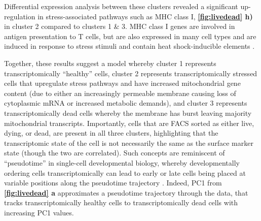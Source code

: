 Differential expression analysis between these clusters revealed a significant up-regulation in stress-associated pathways such as MHC class I,  \textbf{\autoref{fig:livedead} h)} in cluster 2 compared to clusters 1 \& 3. MHC class I genes are involved in antigen presentation to T cells, but are also expressed in many cell types and are induced in response to stress stimuli and contain heat shock-inducible elements \cite{gleimer2003stress}. 

Together, these results suggest a model whereby cluster 1 represents transcriptomically ``healthy'' cells, cluster 2 represents transcriptomically stressed cells that upregulate stress pathways  and have increased mitochondrial gene content (due to either an increasingly permeable membrane causing loss of cytoplasmic mRNA or increased metabolic demands), and cluster 3 represents transcriptomically dead cells whereby the membrane has burst leaving majority mitochondrial transcripts. Importantly, cells that are FACS sorted as either live, dying, or dead, are present in all three clusters, highlighting that the transcriptomic state of the cell is not necessarily the same as the surface marker state (though the two are correlated). Such concepts are reminiscent of ``pseudotime'' in single-cell developmental biology, whereby developmentally ordering cells transcriptomically can lead to early or late cells being placed at variable positions along the pseudotime trajectory \cite{campbell2018descriptive,campbell2018uncovering}. Indeed, PC1 from \textbf{\autoref{fig:livedead} a} approximates a pseudotime trajectory through the data, that tracks transcriptomically healthy cells to transcriptomically dead cells with increasing PC1 values.

